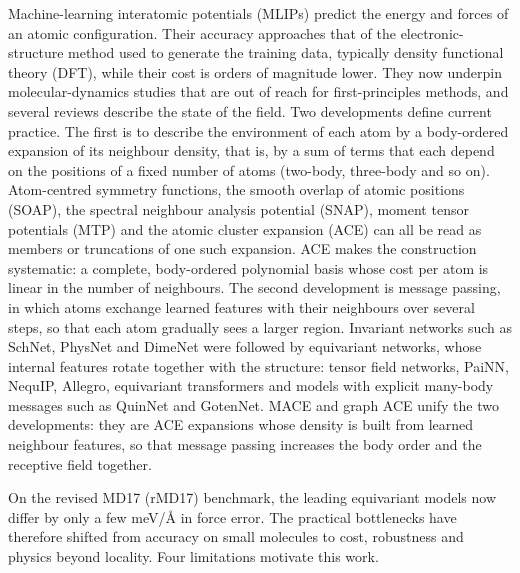 \documentclass[journal=jctcce,manuscript=article,layout=traditional]{achemso}
\begin{document}
Machine-learning interatomic potentials (MLIPs) predict the energy and forces of an atomic configuration. Their
accuracy approaches that of the electronic-structure method used to generate the training data, typically density
functional theory (DFT), while their cost is orders of magnitude lower\cite{behler2007,bartok2010gap}. They now underpin molecular-dynamics studies that are out of reach for
first-principles methods, and several reviews describe the state of the field\cite{unke2021chemrev,musil2021chemrev}.
Two developments define current practice. The first is to describe the environment of each atom by a body-ordered
expansion of its neighbour density, that is, by a sum of terms that each depend on the positions of a fixed number of
atoms (two-body, three-body and so on). Atom-centred symmetry functions\cite{behler2011sf}, the smooth overlap of atomic
positions (SOAP)\cite{bartok2013soap}, the spectral neighbour analysis potential (SNAP)\cite{thompson2015snap},
moment tensor potentials (MTP)\cite{shapeev2016} and the atomic cluster expansion
(ACE)\cite{drautz2019,dusson2022ace,lysogorskiy2021} can all be read as members or truncations of one such expansion.
ACE makes the construction systematic: a complete, body-ordered polynomial basis whose cost per atom is linear in
the number of neighbours. The second development is message passing, in which atoms exchange learned features with their neighbours over
several steps, so that each atom gradually sees a larger region. Invariant networks such as SchNet\cite{schutt2018schnet}, PhysNet\cite{unke2019physnet} and
DimeNet\cite{gasteiger2020dimenet} were followed by equivariant networks, whose internal features rotate
together with the structure: tensor field
networks\cite{thomas2018tfn}, PaiNN\cite{schutt2021painn}, NequIP\cite{batzner2022}, Allegro\cite{musaelian2023},
equivariant transformers\cite{liao2023equiformer,frank2022so3krates,wang2024visnet} and models with explicit
many-body messages such as QuinNet\cite{wang2023quinnet} and GotenNet\cite{aykent2025gotennet}. MACE\cite{batatia2022mace}
and graph ACE\cite{bochkarev2024grace} unify the two developments: they are ACE expansions whose density is built from
learned neighbour features, so that message passing increases the body order and the receptive field
together\cite{batatia2022botnet}.

On the revised MD17 (rMD17) benchmark\cite{chmiela2017md17,christensen2020rmd17}, the leading equivariant models now
differ by only a few meV/\AA{} in force error. The practical bottlenecks have therefore shifted from accuracy on small
molecules to cost, robustness and physics beyond locality. Four limitations motivate this work.
\end{document}
